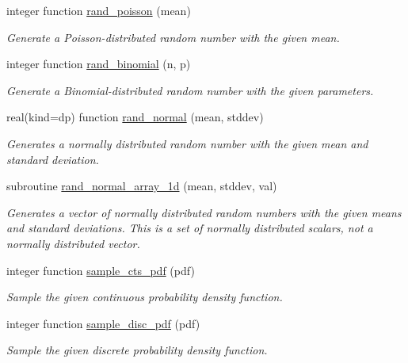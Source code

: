 \begin{DoxyCompactItemize}
integer function \mbox{\hyperlink{namespacepmc__rand_a815e907dd53313f0bc950a71c72c5bb4}{rand\+\_\+poisson}} (mean)
\begin{DoxyCompactList}\small\item\em Generate a Poisson-\/distributed random number with the given mean. \end{DoxyCompactList}\item 
integer function \mbox{\hyperlink{namespacepmc__rand_a4f8465fceab04e6f853f484509121fc1}{rand\+\_\+binomial}} (n, p)
\begin{DoxyCompactList}\small\item\em Generate a Binomial-\/distributed random number with the given parameters. \end{DoxyCompactList}\item 
real(kind=dp) function \mbox{\hyperlink{namespacepmc__rand_ad0761e89156bd0a92a7d3a504d4c95fb}{rand\+\_\+normal}} (mean, stddev)
\begin{DoxyCompactList}\small\item\em Generates a normally distributed random number with the given mean and standard deviation. \end{DoxyCompactList}\item 
subroutine \mbox{\hyperlink{namespacepmc__rand_a5ebdbd9553832208d4a3a43112550ca4}{rand\+\_\+normal\+\_\+array\+\_\+1d}} (mean, stddev, val)
\begin{DoxyCompactList}\small\item\em Generates a vector of normally distributed random numbers with the given means and standard deviations. This is a set of normally distributed scalars, not a normally distributed vector. \end{DoxyCompactList}\item 
integer function \mbox{\hyperlink{namespacepmc__rand_a69a67c16e1e0a2ea9946e307775237e8}{sample\+\_\+cts\+\_\+pdf}} (pdf)
\begin{DoxyCompactList}\small\item\em Sample the given continuous probability density function. \end{DoxyCompactList}\item 
integer function \mbox{\hyperlink{namespacepmc__rand_a38a356c6ac89e03417f24d20f31e7d6e}{sample\+\_\+disc\+\_\+pdf}} (pdf)
\begin{DoxyCompactList}\small\item\em Sample the given discrete probability density function. \end{DoxyCompactList}\item 

\end{DoxyCompactItemize}
